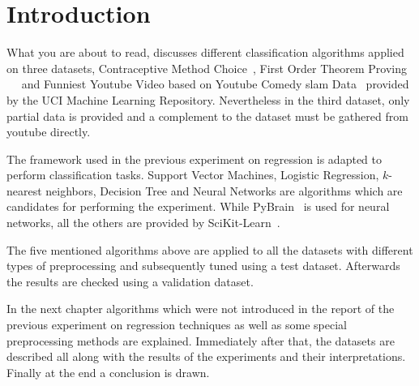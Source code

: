 \section{Introduction}
What you are about to read, discusses different classification algorithms
applied on three datasets, Contraceptive Method Choice~\cite{ds1:uci}, First
Order Theorem Proving ~\cite{ds2:uci}~\cite{ds2:paper} and Funniest
Youtube Video based on Youtube Comedy slam Data~\cite{ds3:uci} provided by the
UCI Machine Learning Repository.
Nevertheless in the third dataset, only partial data is provided and a
complement to the dataset must be gathered from
youtube directly.

\par The framework used in the previous experiment on regression is adapted to
perform classification tasks. Support Vector Machines, Logistic Regression, $k$-nearest neighbors,
Decision Tree and Neural Networks are algorithms which are candidates for
performing the experiment. While PyBrain~\cite{pybrain} is used for neural
networks, all the others are provided by SciKit-Learn~\cite{scikit}.

The five mentioned algorithms above are applied to all the datasets with
different types of preprocessing and subsequently tuned using a test dataset.
Afterwards the results are checked using a validation dataset.

\par In the next chapter algorithms which were not introduced in the report of
the previous experiment on regression techniques as well as some special
preprocessing methods are explained.
Immediately after that, the datasets are described all along with the results of
the experiments and their interpretations. Finally at the end a conclusion is drawn.
 
